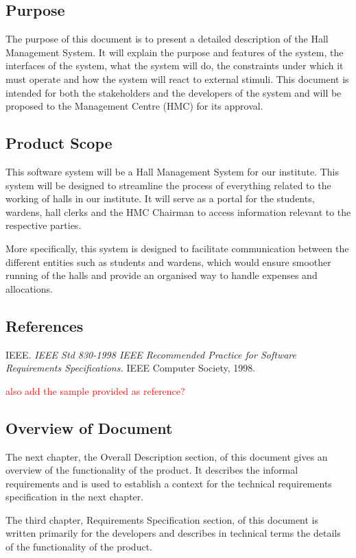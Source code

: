 \documentclass[letterpaper,12pt]{article}
\begin{document}
\subsection{\Large Purpose}
    The purpose of this document is to present a detailed description of the Hall Management System. It will explain the purpose and features of the system, the interfaces
of the system, what the system will do, the constraints under which it must operate and
how the system will react to external stimuli. This document is intended for both the
stakeholders and the developers of the system and will be proposed to the  Management Centre (HMC) for its approval.
\subsection{\Large Product Scope}
This software system will be a Hall Management System for our institute. This system will be designed to streamline the process of everything related to the working of halls in our institute. It will serve as a portal for the students, wardens, hall clerks and the HMC Chairman to access information relevant to the respective parties.

More specifically, this system is designed to facilitate communication between the different entities such as students and wardens, which would ensure smoother running of the halls and provide an organised way to handle expenses and allocations.

\subsection{\Large References}
IEEE. \emph{IEEE Std 830-1998 IEEE Recommended Practice for Software Requirements
Specifications.} IEEE Computer Society, 1998.

\textcolor{red}{also add the sample provided as reference?}
\subsection{\Large Overview of Document}
The next chapter, the Overall Description section, of this document gives an
overview of the functionality of the product. It describes the informal requirements and is
used to establish a context for the technical requirements specification in the next chapter.

The third chapter, Requirements Specification section, of this document is written
primarily for the developers and describes in technical terms the details of the
functionality of the product.
\end{document}
